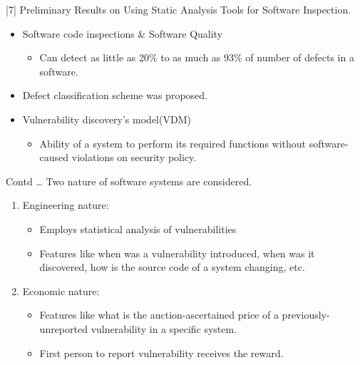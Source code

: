 \documentclass[xcolor=x11names,compress]{beamer}
\renewcommand{\(}{\begin{columns}}
\renewcommand{\)}{\end{columns}}
\newcommand{\<}[1]{\begin{column}{#1}}
\renewcommand{\>}{\end{column}}
\begin{document}
\begin{frame}{[7] Preliminary Results
		on Using Static Analysis Tools for Software Inspection.}
	\begin{itemize}
		\item Software code inspections \& Software Quality
		\begin{itemize}
			\item Can detect as little
			as 20\% to as much as 93\% of number of defects in a software.\newline
		\end{itemize}
		\item Defect classification scheme was proposed.\newline
		\item Vulnerability
		discovery’s model(VDM)
		\begin{itemize}
			\item Ability of a system to perform
			its required functions without software-caused violations on security
			policy.
			
		\end{itemize}
	
	\end{itemize}
\end{frame}
\begin{frame}{Contd \dots}
	Two nature of software systems are considered.
	\newline
		\begin{enumerate}
			\item Engineering nature:
			\begin{itemize}
				\item Employs statistical analysis of vulnerabilities
				\item  Features like when was a vulnerability introduced, when was it discovered, how is the source code of a system changing, etc.
				
			\end{itemize}
			\item Economic nature:
			\begin{itemize}
				\item Features like what is the auction-ascertained price of a previously-unreported vulnerability in a specific system.
				\item First person to report vulnerability receives the reward.
			\end{itemize}
		\end{enumerate} 

\end{frame}
\end{document}
